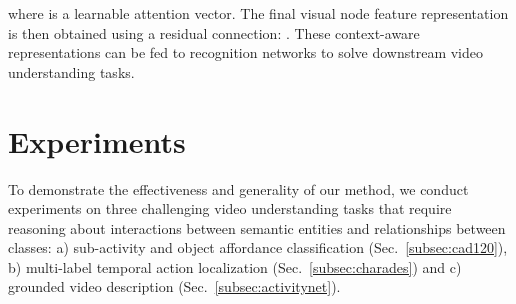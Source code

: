 \documentclass[runningheads]{llncs}
\begin{document}
where  is a learnable attention vector.
The final visual node feature representation is then obtained using a residual connection: . These context-aware representations can be fed to recognition networks to solve downstream video understanding tasks. 
 \section{Experiments}
\label{sec:experiments}
To demonstrate the effectiveness and generality of our method, we conduct experiments on three challenging video understanding tasks that require reasoning about interactions between semantic entities and relationships between classes: a) sub-activity and object affordance classification (Sec.~\ref{subsec:cad120}), b) multi-label temporal action localization (Sec.~\ref{subsec:charades}) and c) grounded video description (Sec.~\ref{subsec:activitynet}).
\begin{table}[t]
\caption{\textbf{Results on CAD-120~\cite{Koppula:IJRR13}} for sub-activity and object
affordance detection, measured via F1-score. Our results are averaged over five random runs, with the standard deviation reported in parentheses.}
\label{tab:cad120_sota}
\centering
{}

\end{table}
\end{document}
